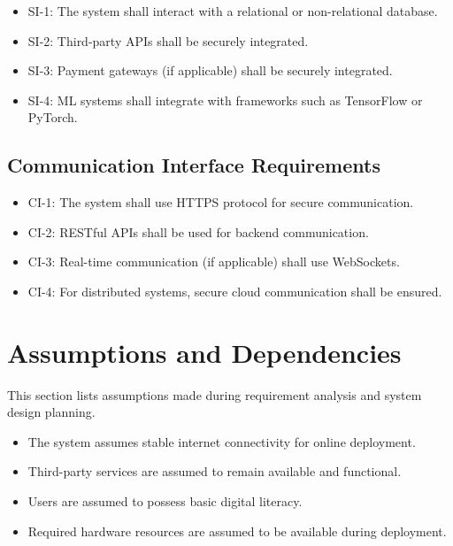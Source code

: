 \begin{itemize}
\item SI-1: The system shall interact with a relational or non-relational database.
\item SI-2: Third-party APIs shall be securely integrated.
\item SI-3: Payment gateways (if applicable) shall be securely integrated.
\item SI-4: ML systems shall integrate with frameworks such as TensorFlow or PyTorch.
\end{itemize}


\subsection{Communication Interface Requirements}

\begin{itemize}
\item CI-1: The system shall use HTTPS protocol for secure communication.
\item CI-2: RESTful APIs shall be used for backend communication.
\item CI-3: Real-time communication (if applicable) shall use WebSockets.
\item CI-4: For distributed systems, secure cloud communication shall be ensured.
\end{itemize}



\section{Assumptions and Dependencies}

This section lists assumptions made during requirement analysis and system design planning.

\begin{itemize}
\item The system assumes stable internet connectivity for online deployment.
\item Third-party services are assumed to remain available and functional.
\item Users are assumed to possess basic digital literacy.
\item Required hardware resources are assumed to be available during deployment.
\end{itemize}



